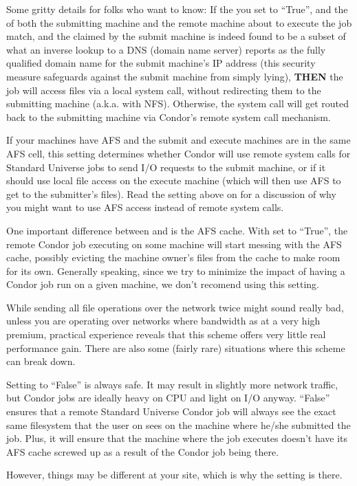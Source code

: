\begin{description}
  Some gritty details for folks who want to know: If the you set
   to ``True'', and the  of
  both the submitting machine and the remote machine about to execute
  the job match, and the  claimed by the
  submit machine is indeed found to be a subset of what an inverse
  lookup to a DNS (domain name server) reports as the fully qualified
  domain name for the submit machine's IP address (this security
  measure safeguards against the submit machine from simply lying),
  \textbf{THEN} the job will access files via a local system call,
  without redirecting them to the submitting machine (a.k.a. with
  NFS).  Otherwise, the system call will get routed back to the
  submitting machine via Condor's remote system call mechanism.
  
\item[\Macro{USE\_AFS}] \label{param:UseAfs} If your machines have AFS
  and the submit and execute machines are in the same AFS cell, this
  setting determines whether Condor will use remote system calls for
  Standard Universe jobs to send I/O requests to the submit machine,
  or if it should use local file access on the execute machine (which
  will then use AFS to get to the submitter's files).  Read the
  setting above on  for a discussion of why you might
  want to use AFS access instead of remote system calls.
  
  One important difference between  and
   is the AFS cache.  With  set to
  ``True'', the remote Condor job executing on some machine will start
  messing with the AFS cache, possibly evicting the machine owner's
  files from the cache to make room for its own.  Generally speaking,
  since we try to minimize the impact of having a Condor job run on a
  given machine, we don't recomend using this setting.

  While sending all file operations over the network twice might sound
  really bad, unless you are operating over networks where bandwidth
  as at a very high premium, practical experience reveals that this
  scheme offers very little real performance gain.  There are also
  some (fairly rare) situations where this scheme can break down.
  
  Setting  to ``False'' is always safe.  It may result
  in slightly more network traffic, but Condor jobs are ideally heavy
  on CPU and light on I/O anyway.  ``False'' ensures that a remote
  Standard Universe Condor job will always see the exact same
  filesystem that the user on sees on the machine where he/she
  submitted the job.  Plus, it will ensure that the machine where the
  job executes doesn't have its AFS cache screwed up as a result of
  the Condor job being there.  
  
  However, things may be different at your site, which is why the
  setting is there.

\end{description}

